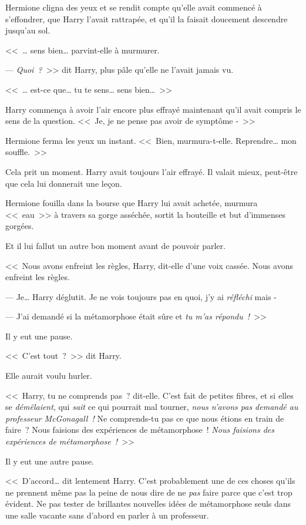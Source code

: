 Hermione cligna des yeux et se rendit compte qu'elle avait commencé à s'effondrer, que Harry l'avait rattrapée, et qu'il la faisait doucement descendre jusqu'au sol.

<<~… sens bien… parvint-elle à murmurer.

--- \emph{Quoi~?}~>> dit Harry, plus pâle qu'elle ne l'avait jamais vu.

<<~… est-ce que… tu te sens… sens bien…~>>

Harry commença à avoir l'air encore plus effrayé maintenant qu'il avait compris le sens de la question. <<~Je, je ne pense pas avoir de symptôme -~>>

Hermione ferma les yeux un instant. <<~Bien, murmura-t-elle. Reprendre… mon souffle.~>>

Cela prit un moment. Harry avait toujours l'air effrayé. Il valait mieux, peut-être que cela lui donnerait une leçon.

Hermione fouilla dans la bourse que Harry lui avait achetée, murmura <<~eau~>> à travers sa gorge asséchée, sortit la bouteille et but d'immenses gorgées.

Et il lui fallut un autre bon moment avant de pouvoir parler.

<<~Nous avons enfreint les règles, Harry, dit-elle d'une voix cassée. Nous avons enfreint les règles.

--- Je… Harry déglutit. Je ne vois toujours pas en quoi, j'y ai \emph{réfléchi} mais -

--- J'ai demandé si la métamorphose était sûre et \emph{tu m'as répondu~!}~>>

Il y eut une pause.

<<~C'est tout~?~>> dit Harry.

Elle aurait voulu hurler.

<<~Harry, tu ne comprends pas~? dit-elle. C'est fait de petites fibres, et si elles se \emph{démêlaient}, qui \emph{sait} ce qui pourrait mal tourner, \emph{nous n'avons pas demandé au professeur McGonagall~!} Ne comprends-tu pas ce que nous étions en train de faire~? Nous faisions des expériences de métamorphose~! \emph{Nous faisions des expériences de métamorphose~!}~>>

Il y eut une autre pause.

<<~D'accord… dit lentement Harry. C'est probablement une de ces choses qu'ils ne prennent même pas la peine de nous dire de ne \emph{pas} faire parce que c'est trop évident. Ne pas tester de brillantes nouvelles idées de métamorphose seuls dans une salle vacante sans d'abord en parler à un professeur.


